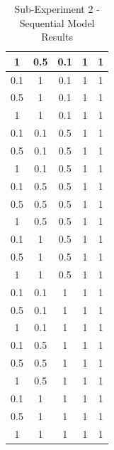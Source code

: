 \begin{table}[htbp]
{\begin{minipage}{\textwidth}
\begin{tabular}{||c c c c c||}
				\hline
				1 & 0.5 & 0.1 & 1 & 1 \\ 
				\hline
				0.1 & 1 & 0.1 & 1 & 1 \\ 
				\hline
				0.5 & 1 & 0.1 & 1 & 1 \\ 
				\hline
				1 & 1 & 0.1 & 1 & 1 \\ 
				\hline
				0.1 & 0.1 & 0.5 & 1 & 1 \\ 
				\hline
				0.5 & 0.1 & 0.5 & 1 & 1 \\ 
				\hline
				1 & 0.1 & 0.5 & 1 & 1 \\ 
				\hline
				0.1 & 0.5 & 0.5 & 1 & 1 \\ 
				\hline
				0.5 & 0.5 & 0.5 & 1 & 1 \\ 
				\hline
				1 & 0.5 & 0.5 & 1 & 1 \\ 
				\hline
				0.1 & 1 & 0.5 & 1 & 1 \\ 
				\hline
				0.5 & 1 & 0.5 & 1 & 1 \\ 
				\hline
				1 & 1 & 0.5 & 1 & 1 \\ 
				\hline
				0.1 & 0.1 & 1 & 1 & 1 \\ 
				\hline
				0.5 & 0.1 & 1 & 1 & 1 \\ 
				\hline
				1 & 0.1 & 1 & 1 & 1 \\ 
				\hline
				0.1 & 0.5 & 1 & 1 & 1 \\ 
				\hline
				0.5 & 0.5 & 1 & 1 & 1 \\ 
				\hline
				1 & 0.5 & 1 & 1 & 1 \\ 
				\hline
				0.1 & 1 & 1 & 1 & 1 \\ 
				\hline
				0.5 & 1 & 1 & 1 & 1 \\ 
				\hline
				1 & 1 & 1 & 1 & 1 \\ [1ex] 
				\hline
				\hline
			\end{tabular}
	\end{minipage}}
	\caption{Sub-Experiment 2 - Sequential Model Results}
	\label{table:combination_simple_2}
\end{table}

